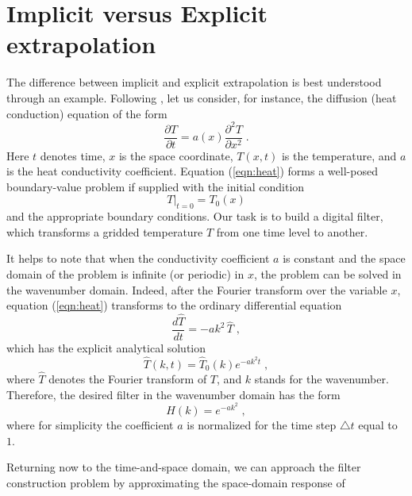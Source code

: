 \section{Implicit versus Explicit extrapolation}

The difference between implicit and explicit extrapolation is best
understood through an example. Following ,
let us consider, for instance, the diffusion (heat conduction) equation
of the form
\begin{equation}
  \label{eqn:heat}
  \frac{\partial T}{\partial t} = a (x) \frac{\partial^2 T}{\partial x^2}\;.
\end{equation}
Here $t$ denotes time, $x$ is the space coordinate, $T (x,t)$ is the
temperature, and $a$ is the heat conductivity coefficient.
Equation (\ref{eqn:heat}) forms a well-posed boundary-value problem if
supplied with the initial condition
\begin{equation}
  \label{eqn:heatinit}
  \left.T\right|_{t=0} = T_0 (x)
\end{equation}
and the appropriate boundary conditions. Our task is to build a
digital filter, which transforms a gridded temperature $T$ from one
time level to another.
\par
It helps to note that when the conductivity coefficient $a$ is
constant and the space domain of the problem is infinite (or periodic)
in $x$, the problem can be solved in the wavenumber domain. Indeed,
after the Fourier transform over the variable $x$, equation
(\ref{eqn:heat}) transforms to the ordinary differential equation
\begin{equation}
  \label{eqn:heatk}
  \frac{d \hat{T}}{d t} = - a k^2\, \hat{T}\;,
\end{equation}
which has the explicit analytical solution
\begin{equation}
  \label{eqn:heatsol}
  \hat{T} (k,t) = \hat{T}_0 (k) e^{- a k^2 t}\;,
\end{equation}
where $\hat{T}$ denotes the Fourier transform of $T$, and $k$ stands
for the wavenumber. Therefore, the desired filter in the
wavenumber domain has the form
\begin{equation}
  \label{eqn:heatf}
  H (k) = e^{- a k^2}\;,
\end{equation}
where for simplicity the coefficient $a$ is normalized for the time
step $\triangle t$ equal to $1$.
\par
Returning now to the time-and-space domain, we can approach the filter
construction problem by approximating the space-domain response of
